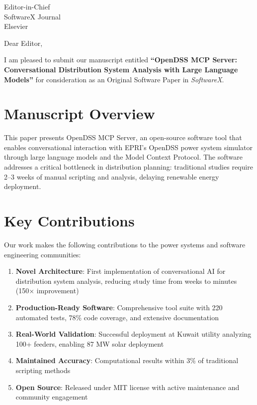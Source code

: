 \documentclass[11pt]{letter}
\begin{document}
\begin{letter}{
Editor-in-Chief\\
SoftwareX Journal\\
Elsevier
}

\opening{Dear Editor,}

I am pleased to submit our manuscript entitled \textbf{``OpenDSS MCP Server: Conversational Distribution System Analysis with Large Language Models''} for consideration as an Original Software Paper in \textit{SoftwareX}.

\section*{Manuscript Overview}

This paper presents OpenDSS MCP Server, an open-source software tool that enables conversational interaction with EPRI's OpenDSS power system simulator through large language models and the Model Context Protocol. The software addresses a critical bottleneck in distribution planning: traditional studies require 2--3 weeks of manual scripting and analysis, delaying renewable energy deployment.

\section*{Key Contributions}

Our work makes the following contributions to the power systems and software engineering communities:

\begin{enumerate}
    \item \textbf{Novel Architecture}: First implementation of conversational AI for distribution system analysis, reducing study time from weeks to minutes (150× improvement)

    \item \textbf{Production-Ready Software}: Comprehensive tool suite with 220 automated tests, 78\% code coverage, and extensive documentation

    \item \textbf{Real-World Validation}: Successful deployment at Kuwait utility analyzing 100+ feeders, enabling 87 MW solar deployment

    \item \textbf{Maintained Accuracy}: Computational results within 3\% of traditional scripting methods

    \item \textbf{Open Source}: Released under MIT license with active maintenance and community engagement
\end{enumerate}


\end{letter}
\end{document}
